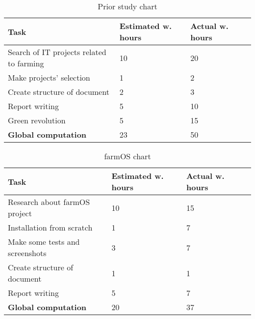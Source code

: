 \begin{table}[H]
\caption{Prior study chart}
\begin{tabular}{llll}
\hline
                               \textbf{Task}    & \textbf{Estimated w. hours} & \textbf{Actual w. hours} \\ \hline
\rowcolor{lightgray}
Search of IT projects related to farming        & 10                          & 20                     \\
Make projects' selection                        & 1                           & 2                      \\
\rowcolor{lightgray}
Create structure of document                    & 2                           & 3                      \\
Report writing                                  & 5                           & 10                     \\
\rowcolor{lightgray}
Green revolution                                & 5                           & 15                     \\
\textbf{Global computation}                     & 23                          & 50                     \\
\end{tabular}
\end{table}

\begin{table}[H]
\caption{farmOS chart}
\begin{tabular}{llll}
\hline
                               \textbf{Task}    & \textbf{Estimated w. hours} & \textbf{Actual w. hours} \\ \hline
\rowcolor{lightgray}
Research about farmOS project                   & 10                          & 15                     \\
Installation from scratch                       & 1                           & 7                      \\
\rowcolor{lightgray}
Make some tests and screenshots                 & 3                           & 7                      \\
Create structure of document                    & 1                           & 1                      \\
\rowcolor{lightgray}
Report writing                                  & 5                           & 7                     \\
\textbf{Global computation}                     & 20                          & 37                     \\
\end{tabular}
\end{table}

